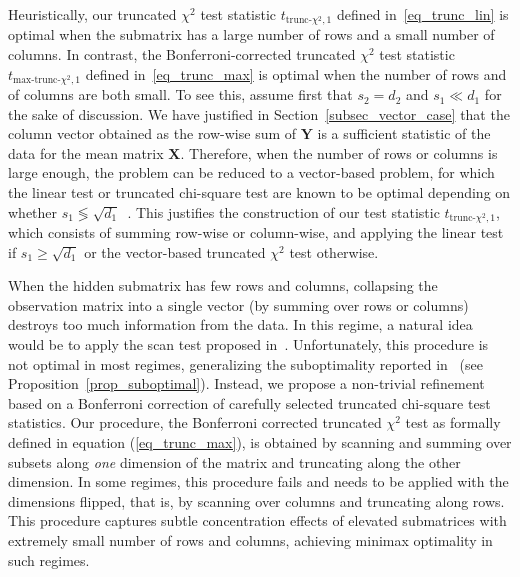 \documentclass{article}
\newcommand{\chisqlin}{\text{trunc-$\chi^2$}}
\newcommand{\chisqmax}{\text{max-trunc-$\chi^2$}}
\theoremstyle{remark}
\begin{document}
Heuristically, our truncated $\chi^2$ test statistic $t_{\chisqlin, 1}$ defined in~\eqref{eq_trunc_lin} is optimal when the submatrix has a large number of rows and a small number of columns. 
In contrast, the Bonferroni-corrected truncated $\chi^2$ test statistic $t_{\chisqmax, 1}$ defined in~\eqref{eq_trunc_max} is optimal when the number of rows and of columns are both small. 
To see this, assume first that $s_2 = d_2$ and $s_1 \ll d_1$ for the sake of discussion. 
We have justified in Section~\ref{subsec_vector_case} that the column vector obtained as the row-wise sum of $\mathbf Y$ is a sufficient statistic of the data for the mean matrix $\mathbf X$. 
Therefore, when the number of rows or columns is large enough, the problem can be reduced to a vector-based problem, for which the linear test or truncated chi-square test are known to be optimal depending on whether $s_1 \lessgtr \sqrt{d_1}$~\citep{collier2017minimax}. This justifies the construction of our test statistic $t_{\chisqlin, 1}$, which consists of summing row-wise or column-wise, and applying the linear test if $s_1 \geq \sqrt{d_1}$ or the vector-based truncated $\chi^2$ test otherwise.

When the hidden submatrix has few rows and columns, collapsing the observation matrix into a single vector (by summing over rows or columns) destroys too much information from the data. 
In this regime, a natural idea would be to apply the scan test proposed in~\cite{butucea2013detection}. Unfortunately, this procedure is not optimal in most regimes, generalizing the suboptimality reported in~\cite{baraud2002non} (see Proposition~\ref{prop_suboptimal}). 
Instead, we propose a non-trivial refinement based on a Bonferroni correction of carefully selected  truncated chi-square test statistics. 
Our procedure, the Bonferroni corrected truncated $\chi^2$ test as formally defined in equation (\ref{eq_trunc_max}), is obtained by scanning and summing over subsets along \textit{one} dimension of the matrix and truncating along the other dimension. 
In some regimes, this procedure fails and needs to be applied with the dimensions flipped, that is, by scanning over columns and truncating along rows. 
This procedure captures subtle concentration effects of elevated submatrices with extremely small number of rows and columns, achieving minimax optimality in such regimes. 

\end{document}
